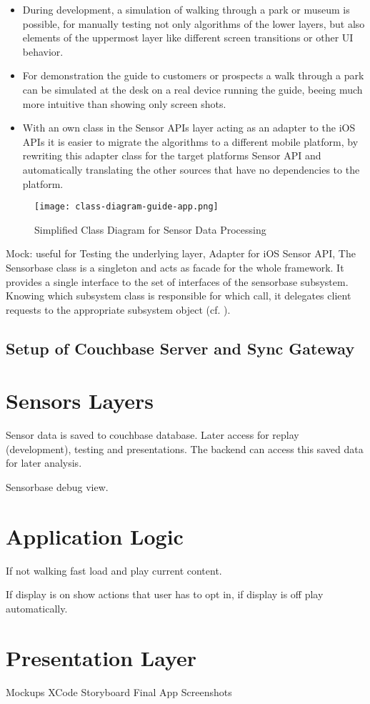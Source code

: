 \begin{itemize}
\item During development, a simulation of walking through a park or museum is possible, for manually testing not only algorithms of the lower layers, but also elements of the uppermost layer like different screen transitions or other UI behavior.
\item For demonstration the guide to customers or prospects a walk through a park can be simulated at the desk on a real device running the guide, beeing much more intuitive than showing only screen shots.
\item With an own class in the Sensor APIs layer acting as an adapter to the iOS APIs it is easier to migrate the algorithms to a different mobile platform, by rewriting this adapter class for the target platforms Sensor API and automatically translating the other sources that have no dependencies to the platform.
\end{itemize}



\begin{figure}[H]
\centering
\texttt{[image: class-diagram-guide-app.png]}
\caption{Simplified Class Diagram for Sensor Data Processing}
\end{figure}

Mock: useful for Testing the underlying layer,
Adapter for iOS Sensor API,
The Sensorbase class is a singleton and acts as facade for the whole framework. It provides a single interface to the set of interfaces of the sensorbase subsystem. Knowing which subsystem class is responsible for which call, it delegates client requests to the appropriate subsystem object (cf. \cite{gof}).

\subsection{Setup of Couchbase Server and Sync Gateway}

\section{Sensors Layers}

Sensor data is saved to couchbase database.
Later access for replay (development), testing and presentations.
The backend can access this saved data for later analysis.

Sensorbase debug view.
\cite{GCD-Reference}

\section{Application Logic}

If not walking fast load and play current content.

If display is on show actions that user has to opt in, if display is off play automatically. 

\section{Presentation Layer}

Mockups
XCode Storyboard
Final App Screenshots